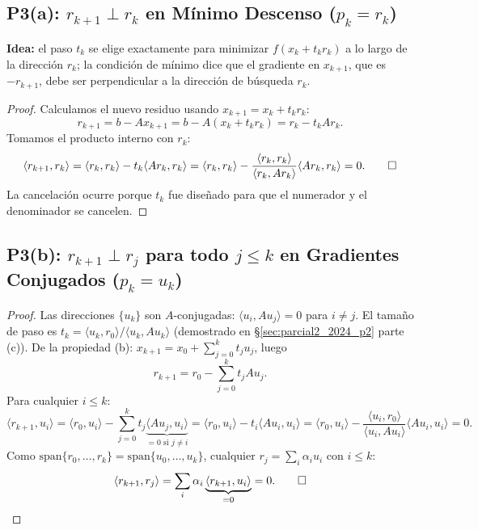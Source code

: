 \documentclass[11pt,a4paper]{article}
\begin{document}
\subsection{P3(a): $r_{k+1}\perp r_k$ en Mínimo Descenso ($p_k = r_k$)}

\textbf{Idea:} el paso $t_k$ se elige exactamente para minimizar $f(x_k+t_kr_k)$ a lo largo de la dirección $r_k$; la condición de mínimo dice que el gradiente en $x_{k+1}$, que es $-r_{k+1}$, debe ser perpendicular a la dirección de búsqueda $r_k$.

\begin{proof}
Calculamos el nuevo residuo usando $x_{k+1}=x_k+t_kr_k$:
\[
  r_{k+1} = b-Ax_{k+1} = b-A(x_k+t_kr_k) = r_k - t_kAr_k.
\]
Tomamos el producto interno con $r_k$:
\[
  \langle r_{k+1},r_k\rangle
  = \langle r_k,r_k\rangle - t_k\langle Ar_k,r_k\rangle
  = \langle r_k,r_k\rangle - \frac{\langle r_k,r_k\rangle}{\langle r_k,Ar_k\rangle}\langle Ar_k,r_k\rangle = 0. \qed
\]
La cancelación ocurre porque $t_k$ fue diseñado para que el numerador y el denominador se cancelen.
\end{proof}

\subsection{P3(b): $r_{k+1}\perp r_j$ para todo $j\le k$ en Gradientes Conjugados ($p_k=u_k$)}
\label{sec:parcial2025_p3b}

\begin{proof}
Las direcciones $\{u_k\}$ son $A$-conjugadas: $\langle u_i,Au_j\rangle = 0$ para $i\neq j$.
El tamaño de paso es $t_k = \langle u_k,r_0\rangle/\langle u_k,Au_k\rangle$
(demostrado en \S\ref{sec:parcial2_2024_p2} parte (c)).
De la propiedad (b): $x_{k+1} = x_0 + \sum_{j=0}^k t_j u_j$, luego
\[
  r_{k+1} = r_0 - \sum_{j=0}^k t_j Au_j.
\]
Para cualquier $i \le k$:
\[
  \langle r_{k+1},u_i\rangle
  = \langle r_0,u_i\rangle - \sum_{j=0}^k t_j\underbrace{\langle Au_j,u_i\rangle}_{=0\text{ si }j\neq i}
  = \langle r_0,u_i\rangle - t_i\langle Au_i,u_i\rangle
  = \langle r_0,u_i\rangle - \frac{\langle u_i,r_0\rangle}{\langle u_i,Au_i\rangle}\langle Au_i,u_i\rangle
  = 0.
\]
Como $\text{span}\{r_0,\ldots,r_k\} = \text{span}\{u_0,\ldots,u_k\}$,
cualquier $r_j = \sum_i \alpha_i u_i$ con $i\le k$:
\[
  \langle r_{k+1},r_j\rangle = \sum_i \alpha_i\underbrace{\langle r_{k+1},u_i\rangle}_{=0} = 0. \qed
\]
\end{proof}

\end{document}
